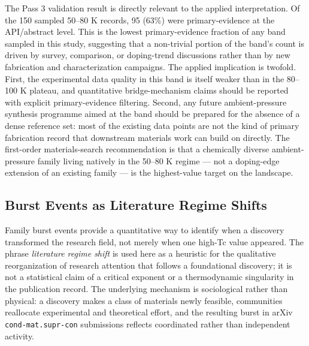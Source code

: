\documentclass[11pt]{article}
\begin{document}
The Pass 3 validation result is directly relevant to the applied interpretation. Of the 150 sampled 50--80 K records, 95 (63\%) were primary-evidence at the API/abstract level. This is the lowest primary-evidence fraction of any band sampled in this study, suggesting that a non-trivial portion of the band's count is driven by survey, comparison, or doping-trend discussions rather than by new fabrication and characterization campaigns. The applied implication is twofold. First, the experimental data quality in this band is itself weaker than in the 80--100 K plateau, and quantitative bridge-mechanism claims should be reported with explicit primary-evidence filtering. Second, any future ambient-pressure synthesis programme aimed at the band should be prepared for the absence of a dense reference set: most of the existing data points are not the kind of primary fabrication record that downstream materials work can build on directly. The first-order materials-search recommendation is that a chemically diverse ambient-pressure family living natively in the 50--80 K regime --- not a doping-edge extension of an existing family --- is the highest-value target on the landscape.

\subsection{Burst Events as Literature Regime Shifts}

Family burst events provide a quantitative way to identify when a discovery transformed the research field, not merely when one high-Tc value appeared. The phrase \emph{literature regime shift} is used here as a heuristic for the qualitative reorganization of research attention that follows a foundational discovery; it is not a statistical claim of a critical exponent or a thermodynamic singularity in the publication record. The underlying mechanism is sociological rather than physical: a discovery makes a class of materials newly feasible, communities reallocate experimental and theoretical effort, and the resulting burst in arXiv \texttt{cond-mat.supr-con} submissions reflects coordinated rather than independent activity.
\end{document}
